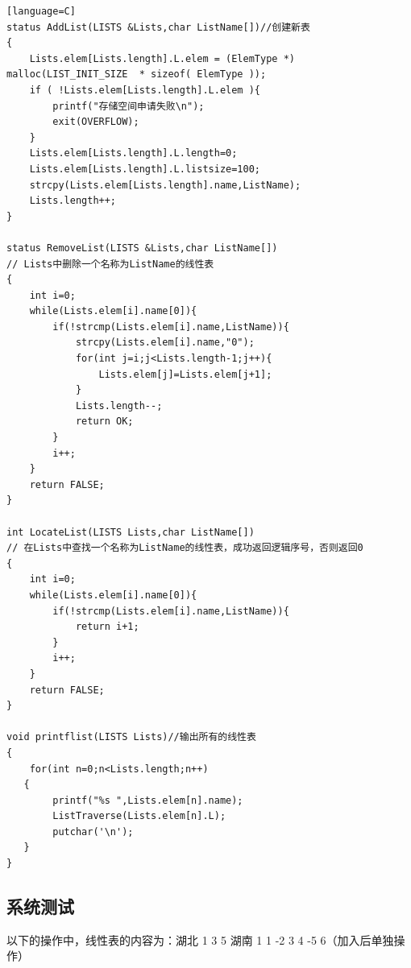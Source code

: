\documentclass[supercite]{Experimental_Report}
\theoremstyle{definition}
\begin{document}
\begin{sloppypar}
\begin{lstlisting}[breaklines][language=C]
status AddList(LISTS &Lists,char ListName[])//创建新表
{
    Lists.elem[Lists.length].L.elem = (ElemType *) malloc(LIST_INIT_SIZE  * sizeof( ElemType ));	
	if ( !Lists.elem[Lists.length].L.elem ){
		printf("存储空间申请失败\n");
		exit(OVERFLOW);
	} 
    Lists.elem[Lists.length].L.length=0;
    Lists.elem[Lists.length].L.listsize=100;
    strcpy(Lists.elem[Lists.length].name,ListName);
    Lists.length++;
}

status RemoveList(LISTS &Lists,char ListName[])
// Lists中删除一个名称为ListName的线性表
{
    int i=0;
    while(Lists.elem[i].name[0]){
        if(!strcmp(Lists.elem[i].name,ListName)){
        	strcpy(Lists.elem[i].name,"0");
            for(int j=i;j<Lists.length-1;j++){
                Lists.elem[j]=Lists.elem[j+1];
            }
            Lists.length--;
            return OK;
        }
        i++;
    }
    return FALSE;
}

int LocateList(LISTS Lists,char ListName[])
// 在Lists中查找一个名称为ListName的线性表，成功返回逻辑序号，否则返回0
{
    int i=0;
    while(Lists.elem[i].name[0]){
        if(!strcmp(Lists.elem[i].name,ListName)){
            return i+1;
        }
        i++;
    }
    return FALSE;
}

void printflist(LISTS Lists)//输出所有的线性表
{
	for(int n=0;n<Lists.length;n++)
   {
   		printf("%s ",Lists.elem[n].name);
   		ListTraverse(Lists.elem[n].L);
        putchar('\n');
   }
}
\end{lstlisting}
\subsection{系统测试}
以下的操作中，线性表的内容为：湖北 1 3 5 湖南 1 1 -2 3 4 -5 6（加入后单独操作） 

\begin{figure}[H]



\end{figure}
\end{sloppypar}
\end{document}
